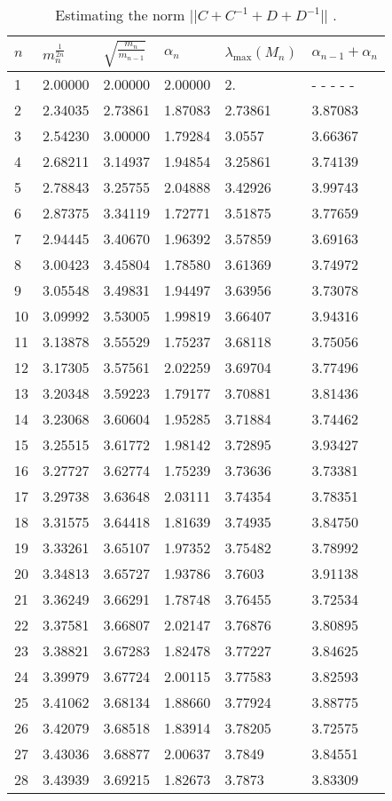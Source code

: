\documentclass{amsart}
\theoremstyle{definition}
\begin{document}
\begin{table}[b]
\begin{tabular}{llllll}
\hline
$n$ &  $m_n^{\frac1{2n}}$ & $\sqrt{\frac{m_{n}}{m_{n-1}}}$& $\alpha_n$ & $\lambda_{\mathrm{max}}(M_n)$ & $\alpha_{n-1}+\alpha_n$\\
\hline
1 & 2.00000 & 2.00000 & 2.00000 & 2. & - - - - -\\
2 & 2.34035 & 2.73861 & 1.87083 & 2.73861 & 3.87083\\
3 & 2.54230 & 3.00000 & 1.79284 & 3.0557 & 3.66367\\
4 & 2.68211 & 3.14937 & 1.94854 & 3.25861 & 3.74139\\
5 & 2.78843 & 3.25755 & 2.04888 & 3.42926 & 3.99743\\
6 & 2.87375 & 3.34119 & 1.72771 & 3.51875 & 3.77659\\
7 & 2.94445 & 3.40670 & 1.96392 & 3.57859 & 3.69163\\
8 & 3.00423 & 3.45804 & 1.78580 & 3.61369 & 3.74972\\
9 & 3.05548 & 3.49831 & 1.94497 & 3.63956 & 3.73078\\
10 & 3.09992 & 3.53005 & 1.99819 & 3.66407 & 3.94316\\
11 & 3.13878 & 3.55529 & 1.75237 & 3.68118 & 3.75056\\
12 & 3.17305 & 3.57561 & 2.02259 & 3.69704 & 3.77496\\
13 & 3.20348 & 3.59223 & 1.79177 & 3.70881 & 3.81436\\
14 & 3.23068 & 3.60604 & 1.95285 & 3.71884 & 3.74462\\
15 & 3.25515 & 3.61772 & 1.98142 & 3.72895 & 3.93427\\
16 & 3.27727 & 3.62774 & 1.75239 & 3.73636 & 3.73381\\
17 & 3.29738 & 3.63648 & 2.03111 & 3.74354 & 3.78351\\
18 & 3.31575 & 3.64418 & 1.81639 & 3.74935 & 3.84750\\
19 & 3.33261 & 3.65107 & 1.97352 & 3.75482 & 3.78992\\
20 & 3.34813 & 3.65727 & 1.93786 & 3.7603 & 3.91138\\
21 & 3.36249 & 3.66291 & 1.78748 & 3.76455 & 3.72534\\
22 & 3.37581 & 3.66807 & 2.02147 & 3.76876 & 3.80895\\
23 & 3.38821 & 3.67283 & 1.82478 & 3.77227 & 3.84625\\
24 & 3.39979 & 3.67724 & 2.00115 & 3.77583 & 3.82593\\
25 & 3.41062 & 3.68134 & 1.88660 & 3.77924 & 3.88775\\
26 & 3.42079 & 3.68518 & 1.83914 & 3.78205 & 3.72575\\
27 & 3.43036 & 3.68877 & 2.00637 & 3.7849 & 3.84551\\
28 & 3.43939 & 3.69215 & 1.82673 & 3.7873 & 3.83309\\
\hline
\end{tabular}
\caption{ Estimating the norm $||C+C^{-1}+D+D^{-1}||$ .}
\label{t:rootsnorms}
\end{table}
\end{document}
